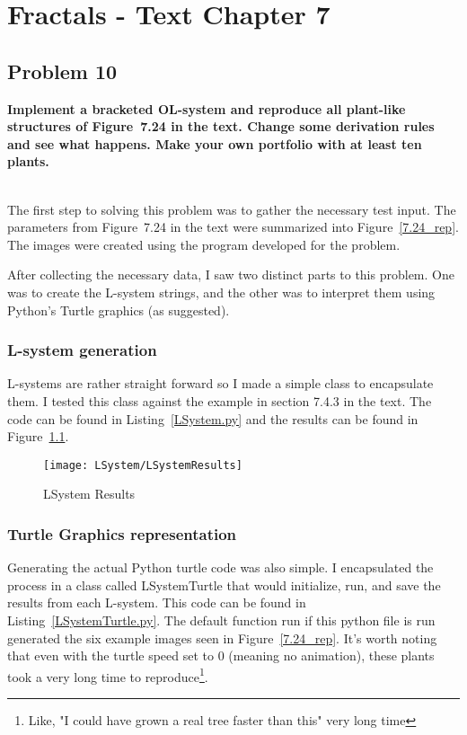 
\chapter{Fractals - Text Chapter 7}

\section{Problem 10}
\textbf{
Implement a bracketed OL-system and reproduce all plant-like structures of Figure~7.24 in the text. Change some derivation rules and see what happens. Make your own portfolio with at least ten plants.
}

\hfill \\

The first step to solving this problem was to gather the necessary test input. The parameters from Figure~7.24 in the text were summarized into Figure~\ref{7.24_rep}. The images were created using the program developed for the problem.

After collecting the necessary data, I saw two distinct parts to this problem. One was to create the L-system strings, and the other was to interpret them using Python's Turtle graphics (as suggested).

\subsection{L-system generation}
L-systems are rather straight forward so I made a simple class to encapsulate them. I tested this class against the example in section 7.4.3 in the text. The code can be found in Listing~\ref{LSystem.py} and the results can be found in Figure~\ref{lsystem_results}.

\begin{figure}
\centering
\texttt{[image: LSystem/LSystemResults]}
\caption{LSystem Results}
\label{lsystem_results}
\end{figure}


\subsection{Turtle Graphics representation}
Generating the actual Python turtle code was also simple. I encapsulated the process in a class called LSystemTurtle that would initialize, run, and save the results from each L-system. This code can be found in Listing~\ref{LSystemTurtle.py}. The default function run if this python file is run generated the six example images seen in Figure~\ref{7.24_rep}. It's worth noting that even with the turtle speed set to 0 (meaning no animation), these plants took a very long time to reproduce\footnote{Like, "I could have grown a real tree faster than this" very long time}.

